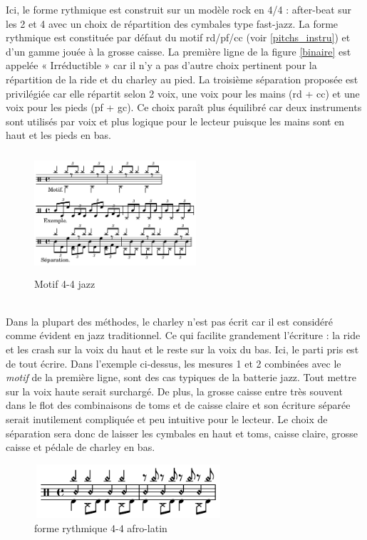 Ici, le forme rythmique est construit sur un modèle rock en 4/4 : after-beat
sur les 2 et 4 avec un choix de répartition des cymbales type fast-jazz. La
forme rythmique est constituée par défaut du motif rd/pf/cc (voir
\ref{pitchs_instru}) et d’un gamme jouée à la grosse caisse. La première ligne
de la figure \ref{binaire} est appelée « Irréductible » car il n’y a pas
d’autre choix pertinent pour la répartition de la ride et du charley au pied.
La troisième séparation proposée est privilégiée car elle répartit selon 2
voix, une voix pour les mains (rd + cc) et une voix pour les pieds (pf + gc).
Ce choix paraît plus équilibré car deux instruments sont utilisés par voix et
plus logique pour le lecteur puisque les mains sont en haut et les pieds en
bas.
\begin{figure}[h]
\centering
\includegraphics[height=45mm, width=60mm]{
z_images/3_methodes/2_systemes/2_separation_4-4_jazz.png}
\caption{Motif 4-4 jazz}
\label{jazz}
\end{figure}\\
Dans la plupart des méthodes, le charley n’est pas écrit car il est considéré comme évident en jazz traditionnel. Ce qui facilite grandement l’écriture : la ride et les crash sur la voix du haut et le reste sur la voix du bas. Ici, le parti pris est de tout écrire. 
Dans l’exemple ci-dessus, 
les mesures 1 et 2 combinées avec le \textit{motif} de la première ligne, sont des cas typiques de la batterie jazz. Tout mettre sur la voix haute serait surchargé. De plus, la grosse caisse entre très souvent dans le flot des combinaisons de toms et de caisse claire et son écriture séparée serait inutilement compliquée et peu intuitive pour le lecteur. Le choix de séparation sera donc de laisser les cymbales en haut et toms, caisse claire, grosse caisse et pédale de charley en bas.

\begin{figure}[h]
	\centering
	\includegraphics[height=20mm, width=70mm]{z_images/3_methodes/2_systemes/3_separation_afro-latins.png}
	\caption{forme rythmique 4-4 afro-latin}
	\label{afro_latin}
\end{figure}

